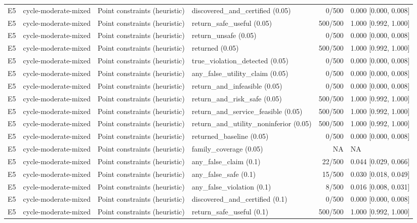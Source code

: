 \begin{longtable}{p{.04\linewidth}p{.18\linewidth}p{.19\linewidth}p{.16\linewidth}r p{.21\linewidth}}
E5 & cycle-moderate-mixed & Point constraints (heuristic) & discovered\_and\_certified (0.05) & 0/500 & 0.000 [0.000, 0.008]\\
E5 & cycle-moderate-mixed & Point constraints (heuristic) & return\_safe\_useful (0.05) & 500/500 & 1.000 [0.992, 1.000]\\
E5 & cycle-moderate-mixed & Point constraints (heuristic) & return\_unsafe (0.05) & 0/500 & 0.000 [0.000, 0.008]\\
E5 & cycle-moderate-mixed & Point constraints (heuristic) & returned (0.05) & 500/500 & 1.000 [0.992, 1.000]\\
E5 & cycle-moderate-mixed & Point constraints (heuristic) & true\_violation\_detected (0.05) & 0/500 & 0.000 [0.000, 0.008]\\
E5 & cycle-moderate-mixed & Point constraints (heuristic) & any\_false\_utility\_claim (0.05) & 0/500 & 0.000 [0.000, 0.008]\\
E5 & cycle-moderate-mixed & Point constraints (heuristic) & return\_and\_infeasible (0.05) & 0/500 & 0.000 [0.000, 0.008]\\
E5 & cycle-moderate-mixed & Point constraints (heuristic) & return\_and\_risk\_safe (0.05) & 500/500 & 1.000 [0.992, 1.000]\\
E5 & cycle-moderate-mixed & Point constraints (heuristic) & return\_and\_service\_feasible (0.05) & 500/500 & 1.000 [0.992, 1.000]\\
E5 & cycle-moderate-mixed & Point constraints (heuristic) & return\_and\_utility\_noninferior (0.05) & 500/500 & 1.000 [0.992, 1.000]\\
E5 & cycle-moderate-mixed & Point constraints (heuristic) & returned\_baseline (0.05) & 0/500 & 0.000 [0.000, 0.008]\\
E5 & cycle-moderate-mixed & Point constraints (heuristic) & family\_coverage (0.05) & NA & NA\\
E5 & cycle-moderate-mixed & Point constraints (heuristic) & any\_false\_claim (0.1) & 22/500 & 0.044 [0.029, 0.066]\\
E5 & cycle-moderate-mixed & Point constraints (heuristic) & any\_false\_safe (0.1) & 15/500 & 0.030 [0.018, 0.049]\\
E5 & cycle-moderate-mixed & Point constraints (heuristic) & any\_false\_violation (0.1) & 8/500 & 0.016 [0.008, 0.031]\\
E5 & cycle-moderate-mixed & Point constraints (heuristic) & discovered\_and\_certified (0.1) & 0/500 & 0.000 [0.000, 0.008]\\
E5 & cycle-moderate-mixed & Point constraints (heuristic) & return\_safe\_useful (0.1) & 500/500 & 1.000 [0.992, 1.000]\\

\end{longtable}
